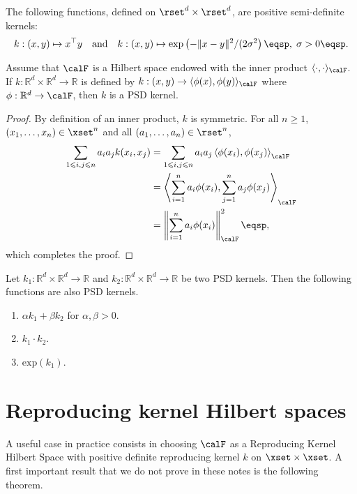 \begin{remark}
The following functions, defined on $\rset^d\times\rset^d$, are positive semi-definite kernels:
$$
k:(x,y)\mapsto x^\top y \quad\mathrm{and}\quad k:(x,y)\mapsto \mathrm{exp}\left(-\|x-y\|^2/(2\sigma^2\right)\eqsp,\; \sigma>0\eqsp.
$$
\end{remark}

\begin{shaded}
\begin{proposition}
Assume that $\calF$ is a Hilbert space endowed with the inner product $\langle \cdot,\cdot\rangle_\calF$. If $k:\mathbb{R}^d\times\mathbb{R}^d\to\mathbb{R}$ is defined by $k:(x,y) \to \langle \phi(x),\phi(y)\rangle_\calF$ where $\phi : \mathbb{R}^d\to \calF$, then $k$ is a PSD kernel.
\end{proposition}
\end{shaded}

\begin{proof}
By definition of an inner product, $k$ is symmetric. For all $n\geqslant 1$, $(x_1,\ldots,x_n)\in\xset^n$ and all $(a_1,\ldots,a_n)\in\rset^n$,
\begin{align*}
\sum_{1\leqslant i,j\leqslant n}a_ia_jk(x_i,x_j) &= \sum_{1\leqslant i,j\leqslant n}a_ia_j\left\langle \phi(x_i) , \phi(x_j)\right\rangle_\calF\\ 
&= \left\langle \sum_{i=1}^na_i\phi(x_i) , \sum_{j=1}^{n}a_j\phi(x_j)\right\rangle_\calF\\
&= \left\|\sum_{i=1}^na_i\phi(x_i)\right\|^2_\calF\eqsp,
\end{align*}
which completes the proof.
\end{proof}

\begin{proposition}
Let $k_1:\mathbb{R}^d\times\mathbb{R}^d\to\mathbb{R}$ and $k_2:\mathbb{R}^d\times\mathbb{R}^d\to\mathbb{R}$ be two PSD kernels. Then the following functions are also PSD kernels.
\begin{enumerate}
\item $\alpha k_1 + \beta k_2$ for $\alpha, \beta>0$.
\item $k_1\cdot k_2$.
\item $\mathrm{exp}(k_1)$.
\end{enumerate}
\end{proposition}

\section{Reproducing kernel Hilbert spaces}
A useful case in practice consists in choosing $\calF$ as a Reproducing Kernel Hilbert Space with positive definite reproducing kernel $k$ on $\xset\times \xset$. A first important result that we do not prove in these notes is the following theorem.


